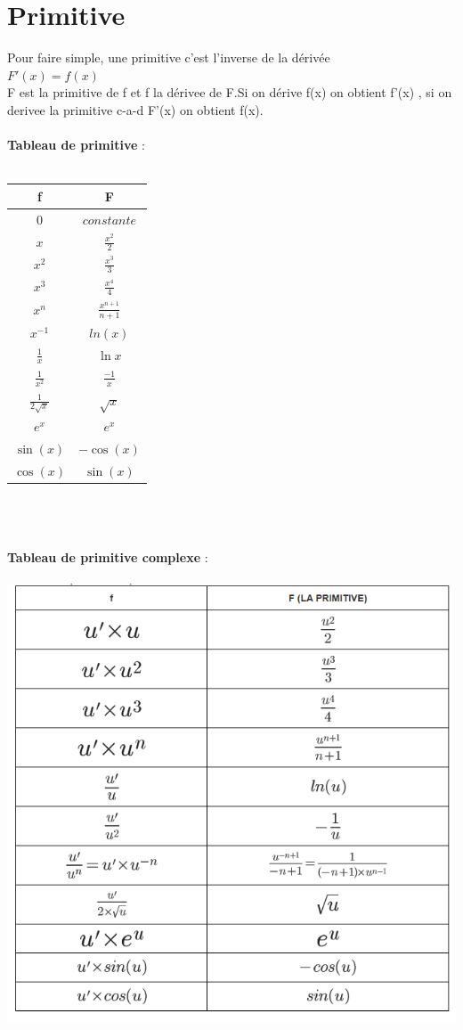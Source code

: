 \documentclass[a4paper,8pt,openany]{book}
\begin{document}
\section{Primitive}
Pour faire simple, une primitive c’est \« l’inverse de la dérivée \» \\
$F'(x)=f(x)$\\
F est la primitive de f et f la dérivee de F.Si on dérive f(x) on obtient f'(x) , si on derivee la primitive c-a-d  F'(x) on obtient f(x).\\
\\
\textbf{Tableau de primitive} :\\
\\
\begin{right}
  \begin{tabular}{|c|c|}
    \hline
    f & F \\ \hline
    $0$ & $constante$ \\ \hline
    $x$ & $\frac{x^2}{2}$ \\ \hline
    $x^2$ & $\frac{x^3}{3}$ \\ \hline
    $x^3$ & $\frac{x^4}{4}$ \\ \hline
    $x^n$ & $\frac{x^{n+1}}{n+1}$ \\ \hline
    $x^{-1} $ & $ln(x)$ \\ \hline
    $\frac{1}{x}$ & $\ln{x}$ \\ \hline
    $\frac{1}{x^2}$ & $\frac{-1}{x} $ \\ \hline
    $\frac{1}{2\sqrt{x}}$ & $\sqrt{x}$ \\ \hline
    $e^x$ & $e^x$ \\ \hline
    $\sin(x)$ & $-\cos(x)$ \\  \hline
    $\cos(x)$ & $\sin(x)$ \\
    \hline
  \end{tabular}
\end{right}
\\
\\
\\
\textbf{Tableau de primitive complexe} :\\
\\
\includegraphics[width=0.65\linewidth ,center]{img/tableau_primitive_complexe.png}
\\
\end{document}
